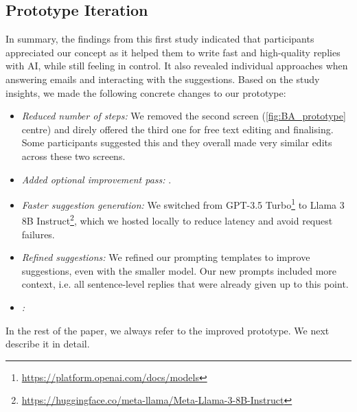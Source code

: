 \subsection{Prototype Iteration}
\label{ssec:protiter}
In summary, the findings from this first study indicated that participants appreciated our concept as it helped them to write fast and high-quality replies with AI, while still feeling in control. It also revealed individual approaches when answering emails and interacting with the suggestions. Based on the study insights, we made the following concrete changes to our prototype:

\begin{itemize}[leftmargin=*]
    \itemsep.2em
    \item \textit{Reduced number of steps:} We removed the second screen (\cref{fig:BA_prototype} centre) %
    and direly offered the third one for free text editing and finalising. Some participants suggested this and they overall made very similar edits across these two screens.
    \item \textit{Added optional improvement pass:} %
    . %
    \item \textit{Faster suggestion generation:} We switched from GPT-3.5 Turbo\footnote{\url{https://platform.openai.com/docs/models}} to Llama 3 8B Instruct\footnote{\url{https://huggingface.co/meta-llama/Meta-Llama-3-8B-Instruct}}\cite{llama3modelcard}, which we hosted locally to reduce latency and avoid request failures. %
    \item \textit{Refined suggestions:} We refined our prompting templates to improve suggestions, even with the smaller model. Our new prompts included more context, i.e. all sentence-level replies that were already given up to this point.  
    \item \textit{:} %
\end{itemize}

In the rest of the paper, we always refer to the improved prototype. We next describe it in detail.
